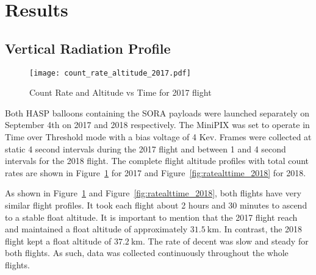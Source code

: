 \section{Results}
\label{Results}

\subsection{Vertical Radiation Profile}

\begin{figure}[H]
\centering
\texttt{[image: count\_rate\_altitude\_2017.pdf]}
\caption{Count Rate and Altitude vs Time for 2017 flight}
\label{fig:ratealttime_2017}
\end{figure}


Both HASP balloons containing the SORA payloads were launched separately on September 4th on 2017 and 2018 respectively.  The MiniPIX was set to operate in Time over Threshold mode with a bias voltage of 4 Kev.  Frames were collected at static 4 second intervals during the 2017 flight and between 1 and 4 second intervals for the 2018 flight.  The complete flight altitude profiles with total count rates are shown in Figure~\ref{fig:ratealttime_2017} for 2017 and Figure~\ref{fig:ratealttime_2018} for 2018.

As shown in Figure~\ref{fig:ratealttime_2017} and Figure~\ref{fig:ratealttime_2018}, both flights have very similar flight profiles.  It took each flight about 2 hours and 30 minutes to ascend to a stable float altitude.  It is important to mention that the 2017 flight reach and maintained a float altitude of approximately $\SI{31.5}{\kilo\meter}$.  In contrast, the 2018 flight kept a float altitude of $\SI{37.2}{\kilo\meter}$.  The rate of decent was slow and steady for both flights.  As such, data was collected continuously throughout the whole flights.


